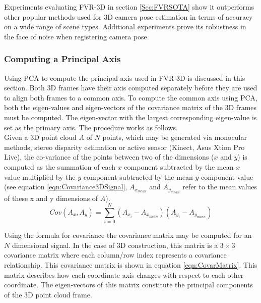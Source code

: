 Experiments evaluating FVR-3D in section \ref{Sec:FVRSOTA} show it outperforms other popular methods used for 3D camera pose estimation in terms of accuracy on a wide range of scene types. Additional experiments prove its robustness in the face of noise when registering camera pose. \\

\subsubsection{Computing a Principal Axis}

Using PCA to compute the principal axis used in FVR-3D is discussed in this section. Both 3D frames have their axis computed separately before they are used to align both frames to a common axis. To compute the common axis using PCA, both the eigen-values and eigen-vectors of the covariance matrix of the 3D frames must be computed. The eigen-vector with the largest corresponding eigen-value is set as the primary axis. The procedure works as follows. \\

Given a 3D point cloud $A$ of $N$ points, which may be generated via monocular methods, stereo disparity estimation or active sensor (Kinect, Asus Xtion Pro Live), the co-variance of the points between two of the dimensions ($x$ and $y$) is computed as the summation of each $x$ component subtracted by the mean $x$ value multiplied by the $y$ component subtracted by the mean $y$ component value (see equation \ref{eqn:Covariance3DSignal}, $A_{x_{mean}}$ and $A_{y_{mean}}$ refer to the mean values of these x and y dimensions of $A$). \\

\begin{equation} \label{eqn:Covariance3DSignal}
Cov(A_x,A_y) = \sum_{i=0}^{N}(A_{x_i} - A_{x_{mean}})(A_{y_i} - A_{y_{mean}})
\end{equation}

Using the formula for covariance the covariance matrix may be computed for an $N$ dimensional signal. In the case of 3D construction, this matrix is a $3 \times 3$ covariance matrix where each column/row index represents a covariance relationship. This covariance matrix is shown in equation \ref{eqn:CovarMatrix}. This matrix describes how each coordinate axis changes with respect to each other coordinate. The eigen-vectors of this matrix constitute the principal components of the 3D point cloud frame. \\

